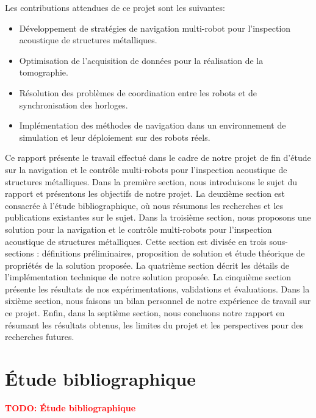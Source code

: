 \documentclass[francais,RandD]{rapportPFE}
\newcommand{\TODO}[1]{\textcolor{red}{\textbf{TODO: #1}}}
\begin{document}
		Les contributions attendues de ce projet sont les suivantes:
		\begin{itemize}
			\item Développement de stratégies de navigation multi-robot pour l'inspection acoustique de structures métalliques.
			\item Optimisation de l'acquisition de données pour la réalisation de la tomographie.
			\item Résolution des problèmes de coordination entre les robots et de synchronisation des horloges.
			\item Implémentation des méthodes de navigation dans un environnement de simulation et leur déploiement sur des robots réels.
		\end{itemize}

		Ce rapport présente le travail effectué dans le cadre de notre projet de fin d'étude sur la navigation et le contrôle multi-robots pour l'inspection acoustique de structures métalliques. Dans la première section, nous introduisons le sujet du rapport et présentons les objectifs de notre projet. La deuxième section est consacrée à l'étude bibliographique, où nous résumons les recherches et les publications existantes sur le sujet. Dans la troisième section, nous proposons une solution pour la navigation et le contrôle multi-robots pour l'inspection acoustique de structures métalliques. Cette section est divisée en trois sous-sections : définitions préliminaires, proposition de solution et étude théorique de propriétés de la solution proposée. La quatrième section décrit les détails de l'implémentation technique de notre solution proposée. La cinquième section présente les résultats de nos expérimentations, validations et évaluations. Dans la sixième section, nous faisons un bilan personnel de notre expérience de travail sur ce projet. Enfin, dans la septième section, nous concluons notre rapport en résumant les résultats obtenus, les limites du projet et les perspectives pour des recherches futures.
	\section{Étude bibliographique}




		\TODO{Étude bibliographique}
\end{document}
